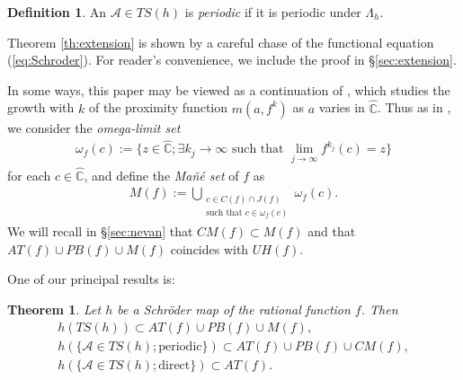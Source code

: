 \documentclass[a4paper,12pt]{amsart}
\theoremstyle{plain}
\newtheorem{mainth}{Theorem}
\theoremstyle{definition}
\newtheorem{definition}[equation]{Definition}
\theoremstyle{remark}
\numberwithin{equation}{section}
\begin{document}
\begin{definition}
 An $\mathcal{A}\in{\mathit{TS}}(h)$ is {\itshape periodic} if it is periodic under $\Lambda_h$. 
\end{definition}
Theorem \ref{th:extension} is shown by
a careful chase of the functional equation (\ref{eq:Schroder}).
For reader's convenience, we include the proof in \S \ref{sec:extension}.

In some ways, this paper may be viewed as a continuation of \cite{DOproximity},
which studies the growth with $k$ of the proximity function $m(a,f^k)$
as $a$ varies in ${\hat{\mathbb{C}}}$. 
Thus as in \cite{DOproximity}, we consider the {\itshape omega-limit set} 
\begin{gather*}
 \omega_f(c):=\{z\in{\hat{\mathbb{C}}};\exists k_j\to\infty\text{ such that }\lim_{j\to\infty}f^{k_j}(c)=z\}
\end{gather*}
 for each $c\in{\hat{\mathbb{C}}}$, and define the {\itshape Ma\~n\'e set} of $f$ as
\begin{align*}
 M(f):=\bigcup_{\substack{c\in C(f)\cap J(f)\\ \text{such that } c\in\omega_f(c)}}\omega_f(c).
\end{align*}
We will recall in \S \ref{sec:nevan} that ${\mathit{CM}}(f)\subset M(f)$
and that ${\mathit{AT}}(f)\cup{\mathit{PB}}(f)\cup M(f)$ coincides with ${\mathit{UH}}(f)$.

One of our principal results is:
\begin{mainth}\label{th:asym}
Let $h$ be a Schr\"oder map of the rational function $f$. Then
\begin{gather}
 h({\mathit{TS}}(h))\subset{\mathit{AT}}(f)\cup{\mathit{PB}}(f)\cup M(f),\label{eq:unhyperbolic}\\
 h(\{\mathcal{A}\in{\mathit{TS}}(h);\text{periodic}\})
 \subset{\mathit{AT}}(f)\cup{\mathit{PB}}(f)\cup{\mathit{CM}}(f),\label{eq:periodic}\\
 h(\{\mathcal{A}\in{\mathit{TS}}(h);\text{direct}\})\subset{\mathit{AT}}(f).\label{eq:directasym}
\end{gather}
\end{mainth}
\end{document}
